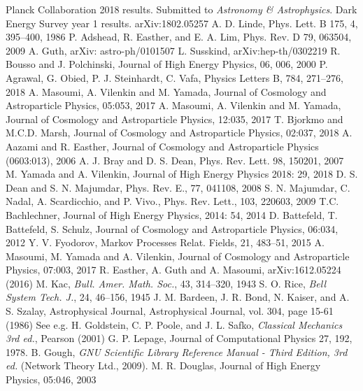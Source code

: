\documentclass[12pt]{article}
\begin{document}
\begin{thebibliography}{99}
 Planck Collaboration 2018 results. Submitted to \emph{Astronomy \& Astrophysics}.
 Dark Energy Survey year 1 results. arXiv:1802.05257
 A. D. Linde, Phys. Lett. B 175, 4, 395--400, 1986
 P. Adshead, R. Easther, and E. A. Lim, Phys. Rev. D 79, 063504, 2009
 A. Guth, arXiv: astro-ph/0101507
 L. Susskind, arXiv:hep-th/0302219
 R. Bousso and J. Polchinski, Journal of High Energy Physics, 06, 006, 2000
 P. Agrawal, G. Obied, P. J. Steinhardt, C. Vafa, Physics Letters B, 784, 271--276, 2018
 A. Masoumi, A. Vilenkin and M. Yamada, Journal of Cosmology and Astroparticle Physics, 05:053, 2017
 A. Masoumi, A. Vilenkin and M. Yamada, Journal of Cosmology and Astroparticle Physics, 12:035, 2017
 T. Bjorkmo and M.C.D. Marsh, Journal of Cosmology and Astroparticle Physics, 02:037, 2018
 A. Aazami and R. Easther, Journal of Cosmology and Astroparticle Physics (0603:013), 2006
 A. J. Bray and D. S. Dean, Phys. Rev. Lett. 98, 150201, 2007
 M. Yamada and A. Vilenkin, Journal of High Energy Physics 2018: 29, 2018
 D. S. Dean and S. N. Majumdar, Phys. Rev. E., 77, 041108, 2008
 S. N. Majumdar, C. Nadal, A. Scardicchio, and P. Vivo., Phys. Rev. Lett., 103, 220603, 2009
 T.C. Bachlechner, Journal of High Energy Physics, 2014: 54, 2014
 D. Battefeld, T. Battefeld, S. Schulz, Journal of Cosmology and Astroparticle Physics, 06:034, 2012
 Y. V. Fyodorov, Markov Processes Relat. Fields, 21, 483--51, 2015
 A. Masoumi, M. Yamada and A. Vilenkin, Journal of Cosmology and Astroparticle Physics, 07:003, 2017
 R. Easther, A. Guth and A. Masoumi, arXiv:1612.05224 (2016)
 M. Kac, \emph{Bull. Amer. Math. Soc.}, 43, 314–320, 1943
  S. O. Rice, \emph{Bell System Tech. J.}, 24, 46--156, 1945
 J. M. Bardeen, J. R. Bond, N. Kaiser, and A. S. Szalay, Astrophysical Journal, Astrophysical Journal, vol. 304, page 15-61 (1986)
 See e.g. H. Goldstein, C. P. Poole, and J. L. Safko, \emph{Classical Mechanics 3rd ed.}, Pearson (2001)
 G. P. Lepage, Journal of Computational Physics 27, 192, 1978.
 B. Gough, \emph{GNU Scientific Library Reference Manual - Third Edition, 3rd ed.} (Network Theory Ltd., 2009).
 M. R. Douglas, Journal of High Energy Physics, 05:046, 2003
\end{thebibliography}
\end{document}
